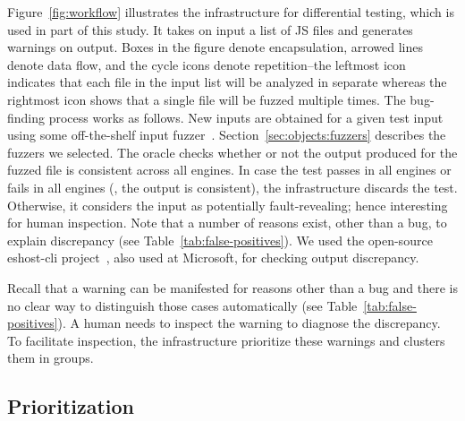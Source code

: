 \documentclass[10pt,conference,anonymous]{IEEEtran}
\begin{document}
Figure~\ref{fig:workflow} illustrates the infrastructure for
differential testing, which is used in part of this study. It takes on
input a list of JS files and generates warnings on output. Boxes in
the figure denote encapsulation, arrowed lines denote data flow, and
the cycle icons denote repetition--the leftmost icon indicates that
each file in the input list will be analyzed in separate whereas the
rightmost icon shows that a single file will be fuzzed multiple times.
The bug-finding process works as follows. New inputs are obtained for
a given test input using some off-the-shelf input
fuzzer~\cite{fuzz-testing-history}.
Section~\ref{sec:objects:fuzzers} describes the fuzzers we selected.
The oracle checks whether or not the output produced for the fuzzed
file is consistent across all engines. In case the test passes in all
engines or fails in all engines (\ie{}, the output is consistent), the
infrastructure discards the test. Otherwise, it considers the input as
potentially fault-revealing; hence interesting for human
inspection. Note that a number of reasons exist, other than a bug, to
explain discrepancy (see Table~\ref{tab:false-positives}). We used the
open-source eshost-cli project~\cite{eshost-cli}, also used at
Microsoft, for checking output discrepancy.


Recall that a warning can be manifested for reasons other than a bug
and there is no clear way to distinguish those cases automatically (see
Table~\ref{tab:false-positives}). A human needs to inspect the warning
to diagnose the discrepancy. To facilitate inspection, the
infrastructure prioritize these warnings and clusters them in
groups.

\subsection{Prioritization}
\end{document}
